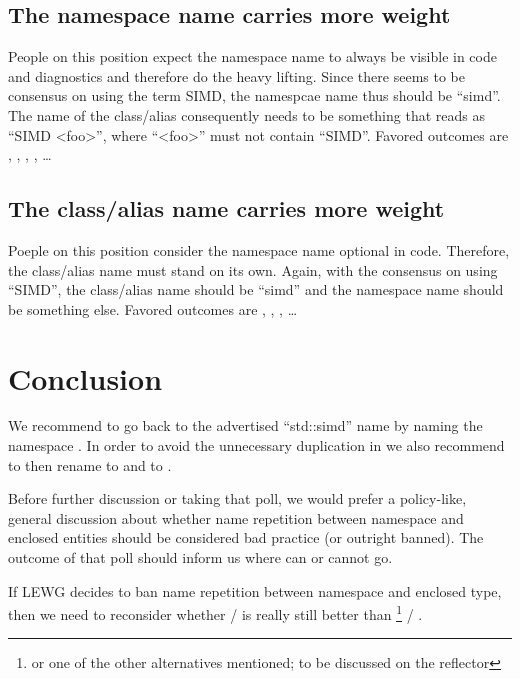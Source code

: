 \subsection{The namespace name carries more weight}
People on this position expect the namespace name to always be visible in code and diagnostics and
therefore do the heavy lifting.
Since there seems to be consensus on using the term SIMD, the namespcae name thus should be “simd”.
The name of the class/alias consequently needs to be something that reads as “SIMD <foo>”, where
“<foo>” must not contain “SIMD”.
Favored outcomes are \stdsimd{}, \stdsimd{}, \stdsimd{},
\stdsimd{}, \ldots

\subsection{The class/alias name carries more weight}
Poeple on this position consider the namespace name optional in code.
Therefore, the class/alias name must stand on its own.
Again, with the consensus on using “SIMD”, the class/alias name should be “simd” and the namespace
name should be something else.
Favored outcomes are \stddatapar{}, \std{},
\std{}, \ldots

\section{Conclusion}

We recommend to go back to the advertised “std::simd” name by naming the namespace
.
In order to avoid the unnecessary duplication in \stdsimd{} we also recommend to
then rename \stdsimd{} to \stdsimd{} and \stdsimd{}
to \stdsimd{}.

Before further discussion or taking that poll, we would prefer a policy-like, general discussion
about whether name repetition between namespace and enclosed entities should be considered bad
practice (or outright banned).
The outcome of that poll should inform us where  can or cannot go.

If LEWG decides to ban name repetition between namespace and enclosed type, then we need to reconsider
whether \stddatapar{} / \stddatapar{} is really still better than
\stdsimd{}\footnote{or one of the other alternatives mentioned; to be discussed on the
reflector} / \stdsimd{}.

